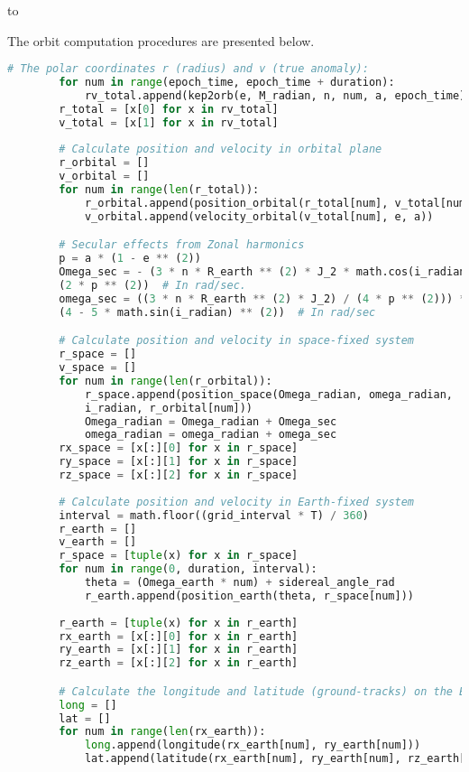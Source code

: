 \documentclass[12pt,a4paper,notitlepage,oneside,openright]{report}
\begin{document}
\def\dashfill{\cleaders\hbox{-}\hfill}
\hbox to \hsize{\dashfill\hfil}

The orbit computation procedures are presented below.
\begin{center}
\begin{lstlisting}[language=Python, formfeed=\newpage, extendedchars=true] 
		# The polar coordinates r (radius) and v (true anomaly):
        for num in range(epoch_time, epoch_time + duration):
            rv_total.append(kep2orb(e, M_radian, n, num, a, epoch_time))
        r_total = [x[0] for x in rv_total]
        v_total = [x[1] for x in rv_total]
        
        # Calculate position and velocity in orbital plane
        r_orbital = []
        v_orbital = []
        for num in range(len(r_total)):
            r_orbital.append(position_orbital(r_total[num], v_total[num]))
            v_orbital.append(velocity_orbital(v_total[num], e, a))

        # Secular effects from Zonal harmonics
        p = a * (1 - e ** (2))
        Omega_sec = - (3 * n * R_earth ** (2) * J_2 * math.cos(i_radian)) /
        (2 * p ** (2))  # In rad/sec.
        omega_sec = ((3 * n * R_earth ** (2) * J_2) / (4 * p ** (2))) *
        (4 - 5 * math.sin(i_radian) ** (2))  # In rad/sec

        # Calculate position and velocity in space-fixed system
        r_space = []
        v_space = []
        for num in range(len(r_orbital)):
            r_space.append(position_space(Omega_radian, omega_radian,
            i_radian, r_orbital[num]))
            Omega_radian = Omega_radian + Omega_sec
            omega_radian = omega_radian + omega_sec
        rx_space = [x[:][0] for x in r_space]
        ry_space = [x[:][1] for x in r_space]
        rz_space = [x[:][2] for x in r_space]
        
        # Calculate position and velocity in Earth-fixed system
        interval = math.floor((grid_interval * T) / 360) 
        r_earth = []
        v_earth = []
        r_space = [tuple(x) for x in r_space]
        for num in range(0, duration, interval):
            theta = (Omega_earth * num) + sidereal_angle_rad
            r_earth.append(position_earth(theta, r_space[num]))
            
        r_earth = [tuple(x) for x in r_earth]
        rx_earth = [x[:][0] for x in r_earth]
        ry_earth = [x[:][1] for x in r_earth]
        rz_earth = [x[:][2] for x in r_earth]

        # Calculate the longitude and latitude (ground-tracks) on the Earth surface
        long = []
        lat = []
        for num in range(len(rx_earth)):
            long.append(longitude(rx_earth[num], ry_earth[num]))
            lat.append(latitude(rx_earth[num], ry_earth[num], rz_earth[num]))

\end{lstlisting}
\end{center}
\end{document}
